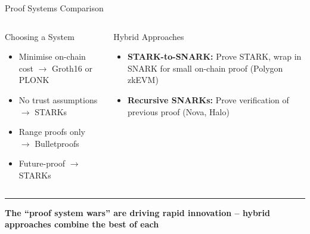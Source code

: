 \documentclass[8pt,aspectratio=169]{beamer}
\newcommand{\bottomnote}[1]{\vfill\vspace{-2mm}\textcolor{mllavender2}{\rule{\textwidth}{0.4pt}}\vspace{1mm}\footnotesize\textbf{#1}}
\begin{document}
\begin{frame}{Proof Systems Comparison}
\footnotesize
{}
\vspace{3mm}
\begin{columns}[T]
\begin{exampleblock}{\footnotesize Choosing a System}
\footnotesize
\begin{itemize}
  \item Minimise on-chain cost $\rightarrow$ Groth16 or PLONK
  \item No trust assumptions $\rightarrow$ STARKs
  \item Range proofs only $\rightarrow$ Bulletproofs
  \item Future-proof $\rightarrow$ STARKs
\end{itemize}
\end{exampleblock}

\begin{block}{\footnotesize Hybrid Approaches}
\footnotesize
\begin{itemize}
  \item \textbf{STARK-to-SNARK:} Prove STARK, wrap in SNARK for small on-chain proof (Polygon zkEVM)
  \item \textbf{Recursive SNARKs:} Prove verification of previous proof (Nova, Halo)
\end{itemize}
\end{block}
\end{columns}
\bottomnote{The ``proof system wars'' are driving rapid innovation -- hybrid approaches combine the best of each}
\end{frame}
\end{document}
